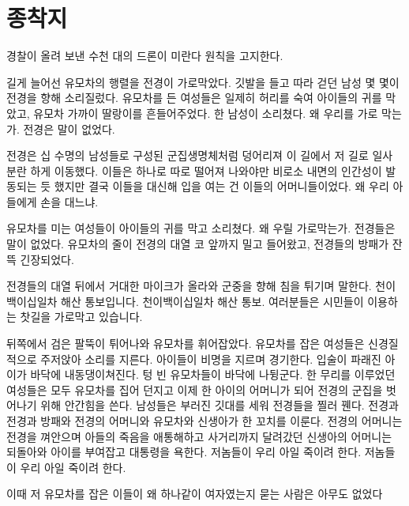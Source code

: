 \documentclass[12pt, b6paper, openany]{memoir}
\newenvironment{lyric}{%
	\setlength{\parindent}{0pt}
}{}
\begin{document}
\begin{lyric}
\hypertarget{uxc885uxcc29uxc9c0}{%

\chapter{종착지}\label{uxc885uxcc29uxc9c0}}



경찰이 올려 보낸 수천 대의 드론이 미란다 원칙을 고지한다.



길게 늘어선 유모차의 행렬을 전경이 가로막았다. 깃발을 들고 따라 걷던 남성 몇 몇이 전경을 향해 소리질렀다. 유모차를 든 여성들은 일제히 허리를 숙여 아이들의 귀를 막았고, 유모차 가까이 딸랑이를 흔들어주었다. 한 남성이 소리쳤다. 왜 우리를 가로 막는가. 전경은 말이 없었다.



전경은 십 수명의 남성들로 구성된 군집생명체처럼 덩어리져 이 길에서 저 길로 일사 분란 하게 이동했다. 이들은 하나로 따로 떨어져 나와야만 비로소 내면의 인간성이 발동되는 듯 했지만 결국 이들을 대신해 입을 여는 건 이들의 어머니들이었다. 왜 우리 아들에게 손을 대느냐.



유모차를 미는 여성들이 아이들의 귀를 막고 소리쳤다. 왜 우릴 가로막는가. 전경들은 말이 없었다. 유모차의 줄이 전경의 대열 코 앞까지 밀고 들어왔고, 전경들의 방패가 잔뜩 긴장되었다.



전경들의 대열 뒤에서 거대한 마이크가 올라와 군중을 향해 침을 튀기며 말한다. 천이백이십일차 해산 통보입니다. 천이백이십일차 해산 통보. 여러분들은 시민들이 이용하는 찻길을 가로막고 있습니다.



뒤쪽에서 검은 팔뚝이 튀어나와 유모차를 휘어잡았다. 유모차를 잡은 여성들은 신경질적으로 주저앉아 소리를 지른다. 아이들이 비명을 지르며 경기한다. 입술이 파래진 아이가 바닥에 내동댕이쳐진다. 텅 빈 유모차들이 바닥에 나뒹군다. 한 무리를 이루었던 여성들은 모두 유모차를 집어 던지고 이제 한 아이의 어머니가 되어 전경의 군집을 벗어나기 위해 안간힘을 쓴다. 남성들은 부러진 깃대를 세워 전경들을 찔러 꿴다. 전경과 전경과 방패와 전경의 어머니와 유모차와 신생아가 한 꼬치를 이룬다. 전경의 어머니는 전경을 껴안으며 아들의 죽음을 애통해하고 사거리까지 달려갔던 신생아의 어머니는 되돌아와 아이를 부여잡고 대통령을 욕한다. 저놈들이 우리 아일 죽이려 한다. 저놈들이 우리 아일 죽이려 한다.



이때 저 유모차를 잡은 이들이 왜 하나같이 여자였는지 묻는 사람은 아무도 없었다




\end{lyric}
\end{document}
